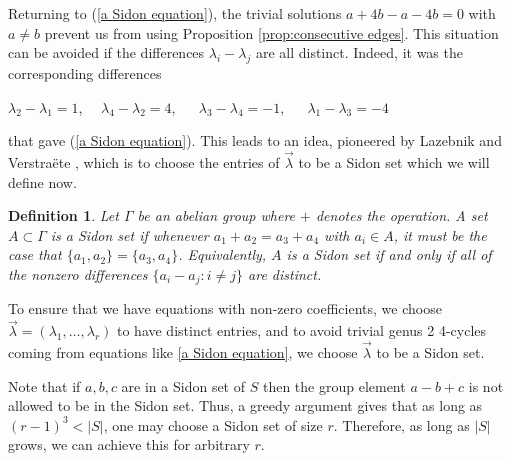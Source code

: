 \documentclass[12pt]{article}%
\newtheorem{definition}[theorem]{Definition}
\def\mike#1{\noindent
\textcolor{green}
{\textsc{(Mike:}
\textsf{#1})}}
\begin{document}
Returning to (\ref{a Sidon equation}), 
the trivial solutions $a + 4b - a - 4b=0$ with $a \neq b$ 
prevent us from using Proposition 
\ref{prop:consecutive edges}.  This situation can be avoided if the differences $\lambda_i - \lambda_j$ are all distinct.  Indeed, it was the corresponding differences 
\begin{center}
    $\lambda_2 - \lambda_1 =  1$,~~
    $\lambda_4 - \lambda_2 = 4$, ~~
    $\lambda_3 - \lambda_4 = -1$, ~~
    $\lambda_1 - \lambda_3 = -4$~~
    \end{center}
that gave (\ref{a Sidon equation}).  This leads to 
an idea, pioneered by Lazebnik and Verstra\"{e}te \cite{LV}, which is to choose the entries of $\vec{ \lambda}$ to be a Sidon set which we will define now.

\begin{definition}\label{def:sidon-set}
    Let $\Gamma$ be an abelian group where $+$ denotes the operation.   A set $A \subset \Gamma$ is a \emph{Sidon set} if whenever $a_1+a_2 = a_3 + a_4$ with $a_i \in A$, it must be the case that $\{a_1, a_2 \} = \{ a_3 , a_4 \}$.  Equivalently, $A$ is a Sidon set if and only if all of the nonzero differences $\{a_i - a_j : i \neq j \}$ are distinct. 
\end{definition}

To ensure that we have equations with non-zero coefficients, we choose $\vec{ \lambda} = ( \lambda_1 , \dots , \lambda_r)$ to have distinct entries, and to avoid trivial genus 2 4-cycles coming from equations like \eqref{a Sidon equation}, we choose $\vec{\lambda}$ to be a Sidon set.

Note that if $a,b,c$ are in a Sidon set of $S$ then the group element $a-b+c$ is not allowed to be in the Sidon set. Thus, a greedy argument gives that as long as $(r-1)^3 < |S|$, one may choose a Sidon set of size $r$.  Therefore, as long as $|S|$ grows, we can achieve this for arbitrary $r$. 
\end{document}
